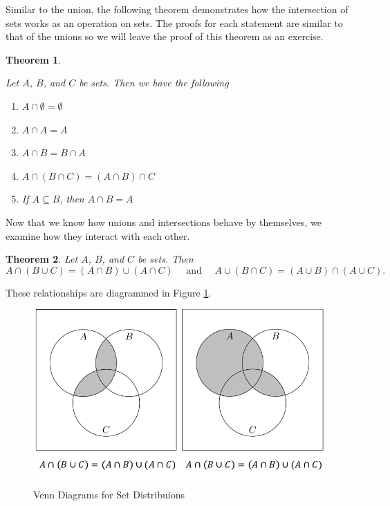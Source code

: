 \documentclass[
]{book}
\newtheorem{theorem}{Theorem}[chapter]
\theoremstyle{definition}
\theoremstyle{definition}
\theoremstyle{definition}
\theoremstyle{definition}
\theoremstyle{remark}
\begin{document}
Similar to the union, the following theorem demonstrates how the intersection of sets works as an operation on sets. The proofs for each statement are similar to that of the unions so we will leave the proof of this theorem as an exercise.

\begin{theorem}
\protect\hypertarget{thm:intersections}{}\label{thm:intersections}

Let \(A\), \(B\), and \(C\) be sets. Then we have the following

\begin{enumerate}
\def\labelenumi{\arabic{enumi}.}
\item
  \(A\cap \emptyset = \emptyset\)
\item
  \(A \cap A = A\)
\item
  \(A \cap B = B \cap A\)
\item
  \(A \cap (B\cap C ) = (A\cap B) \cap C\)
\item
  If \(A \subseteq B\), then \(A \cap B = A\)
\end{enumerate}

\end{theorem}

Now that we know how unions and intersections behave by themselves, we examine how they interact with each other.

\begin{theorem}
\protect\hypertarget{thm:set-distribution}{}\label{thm:set-distribution}Let \(A\), \(B\), and \(C\) be sets. Then
\[ A \cap (B \cup C) = (A \cap B) \cup (A \cap C) \quad \mbox{ and } \quad  A \cup (B \cap C) = (A \cup B) \cap (A \cup C).\]
\end{theorem}

These relationships are diagrammed in Figure \ref{fig:set-distributions}.

\begin{figure}

{\centering \includegraphics[width=0.8\linewidth]{tikz/set-distribution} 

}

\caption{Venn Diagrams for Set Distribuions }\label{fig:set-distributions}
\end{figure}
\end{document}
